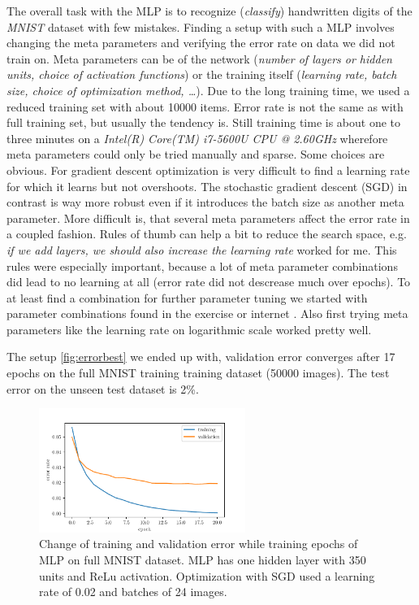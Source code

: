 \documentclass[a4paper,11pt]{article}
\begin{document}
The overall task with the MLP is to recognize (\emph{classify})
handwritten digits of the \emph{MNIST} dataset with few mistakes.
Finding a setup with such a MLP involves changing the meta parameters
and verifying the error rate on data we did not train on.
Meta parameters can be of the network (\emph{number of layers or hidden units,
  choice of activation functions}) or the training itself (\emph{learning rate,
  batch size, choice of optimization method, \dots}).
Due to the long training time, we used a reduced training set with about 10000
items. Error rate is not the same as with full training set, but usually the
tendency is.
Still training time is about one to three minutes on a \emph{Intel(R) Core(TM)
  i7-5600U CPU @ 2.60GHz} wherefore meta parameters could only be tried manually
and sparse.
Some choices are obvious. For gradient descent optimization is very difficult to
find a learning rate for which it learns but not overshoots. The stochastic
gradient descent (SGD) in contrast is way more robust even if it introduces the batch
size as another meta parameter.
More difficult is, that several meta parameters affect the error rate in a
coupled fashion.
Rules of thumb can help a bit to reduce the search space, e.g. \textit{if we add layers,
  we should also increase the learning rate} worked for me.
This rules were especially important, because a lot of meta parameter
combinations did lead to no learning at all (error rate did not descrease much
over epochs).
To at least find a combination for further parameter tuning
we started with parameter combinations found in the exercise or internet
\cite{deeplearningorg}. Also first trying meta parameters like the learning rate
on logarithmic scale worked pretty well.

The setup \autoref{fig:errorbest} we ended up with, validation error converges
after 17 epochs on the full MNIST training training
dataset (50000 images).
The test error on the unseen test dataset is 2\%.

\begin{figure}[ht]
  \centering \includegraphics[width=0.6\textwidth]{assets/error_best.pdf}
  \caption{
    \label{fig:errorbest}
    Change of training and validation error while training epochs of MLP on full
    MNIST dataset. MLP has one hidden layer with 350 units and ReLu activation.
    Optimization with SGD used a learning rate of 0.02 and batches of 24 images.
  }
\end{figure}
\end{document}
